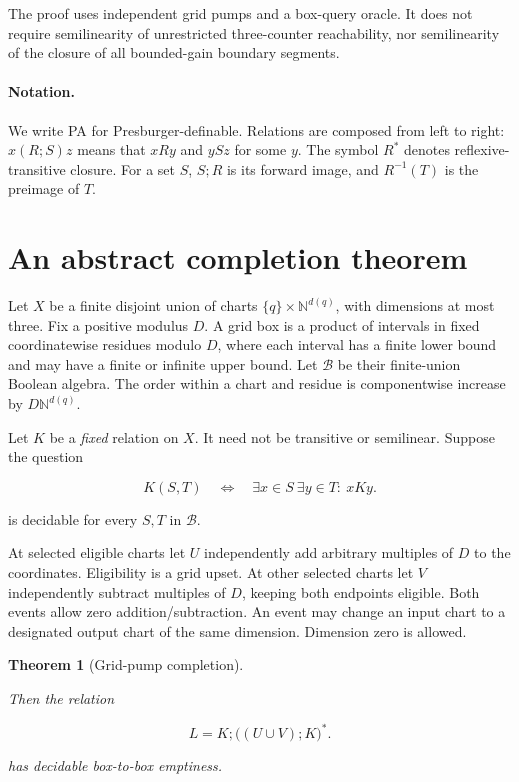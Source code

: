 \documentclass[11pt,a4paper]{article}
\newtheorem{theorem}{Theorem}
\theoremstyle{remark}
\newcommand{\N}{\mathbb N}
\begin{document}
The proof uses independent grid pumps and a box-query oracle. It does not require semilinearity of unrestricted three-counter reachability, nor semilinearity of the closure of all bounded-gain boundary segments.

\paragraph{Notation.}
We write PA for Presburger-definable. Relations are composed from left to
right: \(x(R;S)z\) means that \(xRy\) and \(ySz\) for some \(y\).
The symbol \(R^*\) denotes reflexive-transitive closure. For a set \(S\),
\(S;R\) is its forward image, and \(R^{-1}(T)\) is the preimage of \(T\).

\section{An abstract completion theorem}\label{sec:completion}

Let \(X\) be a finite disjoint union of charts \(\{q\}\times\N^{d(q)}\), with dimensions at most three. Fix a positive modulus \(D\). A grid box is a product of intervals in fixed coordinatewise residues modulo \(D\), where each interval has a finite lower bound and may have a finite or infinite upper bound. Let \(\mathcal B\) be their finite-union Boolean algebra. The order within a chart and residue is componentwise increase by \(D\N^{d(q)}\).

Let \(K\) be a \emph{fixed} relation on \(X\). It need not be transitive or semilinear. Suppose the question

\begin{equation}
K(S,T)\quad\Longleftrightarrow\quad\exists x\in S\ \exists y\in T:\ xKy. \label{eq:box-query}
\end{equation}


is decidable for every \(S,T\) in \(\mathcal B\).

At selected eligible charts let \(U\) independently add arbitrary multiples of \(D\) to the coordinates. Eligibility is a grid upset. At other selected charts let \(V\) independently subtract multiples of \(D\), keeping both endpoints eligible. Both events allow zero addition/subtraction. An event may change an input chart to a designated output chart of the same dimension. Dimension zero is allowed.

\begin{theorem}[Grid-pump completion]\label{thm:completion}

Then the relation

\begin{equation}
L=K;\bigl((U\cup V);K\bigr)^*. \label{eq:language}
\end{equation}


has decidable box-to-box emptiness.

\end{theorem}
\end{document}
